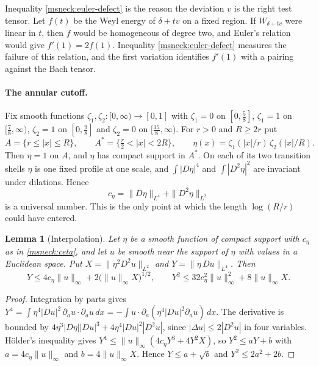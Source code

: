 \documentclass[11pt]{article}
\numberwithin{equation}{section}
\newtheorem{lemma}[theorem]{Lemma}
\theoremstyle{definition}
\theoremstyle{remark}
\begin{document}
Inequality \eqref{msneck:euler-defect} is the reason the deviation \(v\)
is the right test tensor. Let \(f(t)\) be the Weyl energy of
\(\delta+tv\) on a fixed region. If \(W_{\delta+tv}\) were linear in \(t\),
then \(f\) would be homogeneous of degree two, and Euler's relation would
give \(f'(1)=2f(1)\). Inequality \eqref{msneck:euler-defect} measures the
failure of this relation, and the first variation identifies \(f'(1)\)
with a pairing against the Bach tensor.

\paragraph{The annular cutoff.}
Fix smooth functions \(\zeta_1,\zeta_2:[0,\infty)\to[0,1]\) with
\(\zeta_1=0\) on \([0,\tfrac58]\), \(\zeta_1=1\) on \([\tfrac78,\infty)\),
\(\zeta_2=1\) on \([0,\tfrac98]\) and \(\zeta_2=0\) on
\([\tfrac{15}8,\infty)\). For \(r>0\) and \(R\ge2r\) put
\[
 A=\{r\le|x|\le R\},\qquad A^*=\{\tfrac r2<|x|<2R\},\qquad
 \eta(x)=\zeta_1(|x|/r)\,\zeta_2(|x|/R).
\]
Then \(\eta=1\) on \(A\), and \(\eta\) has compact support in \(A^*\).
On each of its two transition shells \(\eta\) is one fixed profile at one
scale, and \(\int|D\eta|^4\) and \(\int|D^2\eta|^2\) are invariant under
dilations. Hence
\begin{equation}\label{msneck:ceta}
 c_\eta=\|D\eta\|_{L^4}+\|D^2\eta\|_{L^2}
\end{equation}
is a universal number. This is the only point at which the length
\(\log(R/r)\) could have entered.

\begin{lemma}[Interpolation]\label{msneck:interpolation}
Let \(\eta\) be a smooth function of compact support with \(c_\eta\) as in
\eqref{msneck:ceta}, and let \(u\) be smooth near the support of \(\eta\)
with values in a Euclidean space. Put \(X=\|\eta^2D^2u\|_{L^2}\) and
\(Y=\|\eta\,Du\|_{L^4}\). Then
\[
 Y\le4c_\eta\|u\|_\infty+2\bigl(\|u\|_\infty X\bigr)^{1/2},\qquad
 Y^2\le32c_\eta^2\|u\|_\infty^2+8\|u\|_\infty X .
\]
\end{lemma}

\begin{proof}
Integration by parts gives
\(Y^4=\int\eta^4|Du|^2\,\partial_au\cdot\partial_au\,dx
=-\int u\cdot\partial_a(\eta^4|Du|^2\partial_au)\,dx\). The derivative is
bounded by \(4\eta^3|D\eta||Du|^3+4\eta^4|Du|^2|D^2u|\), since
\(|\Delta u|\le2|D^2u|\) in four variables. Hölder's inequality gives
\(Y^4\le\|u\|_\infty(4c_\eta Y^3+4Y^2X)\), so \(Y^2\le aY+b\) with
\(a=4c_\eta\|u\|_\infty\) and \(b=4\|u\|_\infty X\). Hence
\(Y\le a+\sqrt b\) and \(Y^2\le2a^2+2b\).
\end{proof}
\end{document}
